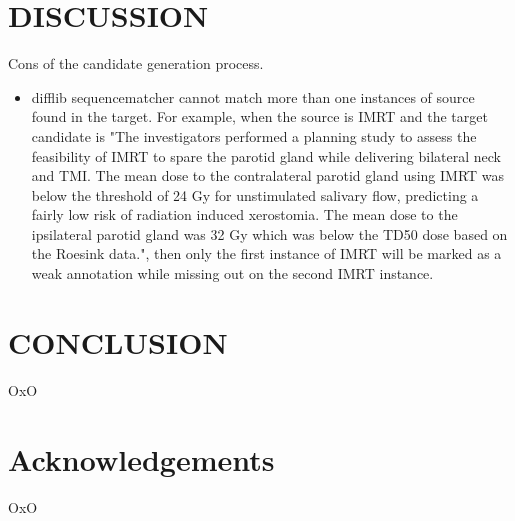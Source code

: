 \documentclass[10.7pt,]{article}
\begin{document}
\section{DISCUSSION}\label{discussion}
%
Cons of the candidate generation process.
\begin{itemize}
    \item difflib sequencematcher cannot match more than one instances of source found in the target. For example, when the source is IMRT and the target candidate is "The investigators performed a planning study to assess the feasibility of IMRT to spare the parotid gland while delivering bilateral neck and TMI. The mean dose to the contralateral parotid gland using IMRT was below the threshold of 24 Gy for unstimulated salivary flow, predicting a fairly low risk of radiation induced xerostomia. The mean dose to the ipsilateral parotid gland was 32 Gy which was below the TD50 dose based on the Roesink data.", then only the first instance of IMRT will be marked as a weak annotation while missing out on the second IMRT instance.
\end{itemize}
%
%
%
\section{CONCLUSION}\label{conclusion}
%
OxO
%
%
%
\section{Acknowledgements}\label{acknowledgements}
%
OxO
%
%
%


\end{document}
